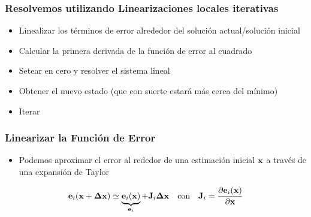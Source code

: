 \begin{frame}
    \frametitle{Resolvemos utilizando Linearizaciones locales iterativas}
    \begin{itemize}
        \item Linealizar los términos de error alrededor del solución actual/solución inicial
        \item Calcular la primera derivada de la función de error al cuadrado
        \item Setear en cero y resolver el sistema lineal
        \item Obtener el nuevo estado (que con suerte estará más cerca del mínimo)
        \item Iterar
    \end{itemize}
\end{frame}

\begin{frame}
    \frametitle{Linearizar la Función de Error}
    
    \begin{itemize}
        \item Podemos aproximar el error al rededor de una estimación inicial $\boldsymbol{\mathbf{x}}$ a través de una expansión de Taylor
    \end{itemize}
    
    \begin{equation*}
        \boldsymbol{\mathbf{e}}_{i}(\boldsymbol{\mathbf{x}} + \boldsymbol{\mathbf{\Delta}}\boldsymbol{\mathbf{x}}) \simeq  \underbrace{\boldsymbol{\mathbf{e}}_{i}(\boldsymbol{\mathbf{x}})}_{\boldsymbol{\mathbf{e}}_{i}} + \boldsymbol{\mathbf{J}}_{i}\boldsymbol{\mathbf{\Delta}}\boldsymbol{\mathbf{x}} \quad \text{con} \quad \boldsymbol{\mathbf{J}}_{i} = \dfrac{\partial\boldsymbol{\mathbf{e}}_{i}(\boldsymbol{\mathbf{x}})}{\partial\boldsymbol{\mathbf{x}}}
    \end{equation*}
    
\end{frame}

